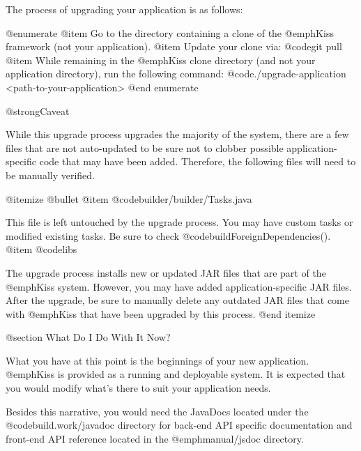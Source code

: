 The process of upgrading your application is as follows:

@enumerate
@item
Go to the directory containing a clone of the @emph{Kiss} framework (not your application).
@item
Update your clone via: @code{git pull}
@item
While remaining in the @emph{Kiss} clone directory (and not your application directory),
run the following command:  @code{./upgrade-application <path-to-your-application>}
@end enumerate

@strong{Caveat}

While this upgrade process upgrades the majority of the system, there
are a few files that are not auto-updated to be sure not to clobber
possible application-specific code that may have been added.
Therefore, the following files will need to be manually verified.

@itemize @bullet
@item
@code{builder/builder/Tasks.java}

This file is left untouched by the upgrade process.  You may have
custom tasks or modified existing tasks.  Be sure to check
@code{buildForeignDependencies()}.
@item
@code{libs}

The upgrade process installs new or updated JAR files that are part of
the @emph{Kiss} system.  However, you may have added
application-specific JAR files.  After the upgrade, be sure to manually delete any
outdated JAR files that come with @emph{Kiss} that have been upgraded
by this process.
@end itemize


@section What Do I Do With It Now?

What you have at this point is the beginnings of your new application.
@emph{Kiss} is provided as a running and deployable system.  It is
expected that you would modify what's there to suit your application
needs.

Besides this narrative, you would need the JavaDocs located under the
@code{build.work/javadoc} directory for back-end API specific documentation and
front-end API reference located in the @emph{manual/jsdoc} directory.
